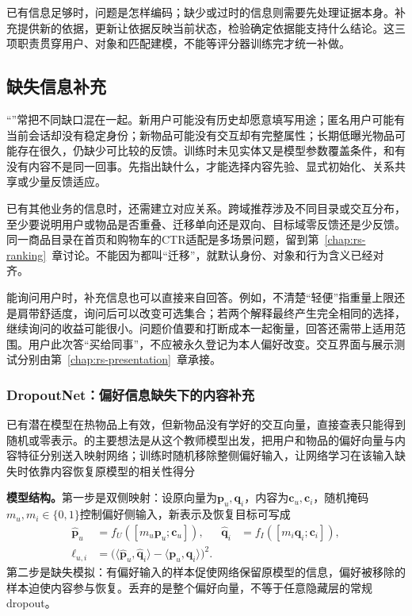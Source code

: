 已有信息足够时，问题是怎样编码；缺少或过时的信息则需要先处理证据本身。补充提供新的依据，更新让依据反映当前状态，检验确定依据能支持什么结论。这三项职责贯穿用户、对象和匹配建模，不能等评分器训练完才统一补做。

\subsection{缺失信息补充}
\label{sec:rs-missing-information}

“”常把不同缺口混在一起。新用户可能没有历史却愿意填写用途；匿名用户可能有当前会话却没有稳定身份；新物品可能没有交互却有完整属性；长期低曝光物品可能存在很久，仍缺少可比较的反馈。训练时未见实体又是模型参数覆盖条件，和有没有内容不是同一回事。先指出缺什么，才能选择内容先验、显式初始化、关系共享或少量反馈适应。

已有其他业务的信息时，还需建立对应关系。跨域推荐涉及不同目录或交互分布，至少要说明用户或物品是否重叠、迁移单向还是双向、目标域零反馈还是少反馈。同一商品目录在首页和购物车的CTR适配是多场景问题，留到第~\ref{chap:rs-ranking}~章讨论。不能因为都叫“迁移”，就默认身份、对象和行为含义已经对齐。

能询问用户时，补充信息也可以直接来自回答。例如，不清楚“轻便”指重量上限还是肩带舒适度，询问后可以改变可选集合；若两个解释最终产生完全相同的选择，继续询问的收益可能很小。问题价值要和打断成本一起衡量，回答还需带上适用范围。用户此次答“买给同事”，不应被永久登记为本人偏好改变。交互界面与展示测试分别由第~\ref{chap:rs-presentation}~章承接。

\subsubsection{DropoutNet：偏好信息缺失下的内容补充}
\label{sec:rs-dropoutnet}

已有潜在模型在热物品上有效，但新物品没有学好的交互向量，直接查表只能得到随机或零表示。的主要想法是从这个教师模型出发，把用户和物品的偏好向量与内容特征分别送入映射网络；训练时随机移除整侧偏好输入，让网络学习在该输入缺失时依靠内容恢复原模型的相关性得分

\textbf{模型结构。}第一步是双侧映射：设原向量为$\bm{p}_u,\bm{q}_i$，内容为$\bm{c}_u,\bm{c}_i$，随机掩码$m_u,m_i\in\{0,1\}$控制偏好侧输入，新表示及恢复目标可写成
\begin{align}
  \widehat{\bm{p}}_u&=f_U([m_u\bm{p}_u;\bm{c}_u]),&
  \widehat{\bm{q}}_i&=f_I([m_i\bm{q}_i;\bm{c}_i]),\\
  \ell_{u,i}&=\bigl(
    \langle\widehat{\bm{p}}_u,\widehat{\bm{q}}_i\rangle
      -\langle\bm{p}_u,\bm{q}_i\rangle\bigr)^2.
  \label{eq:rs-dropoutnet}
\end{align}
第二步是缺失模拟：有偏好输入的样本促使网络保留原模型的信息，偏好被移除的样本迫使内容参与恢复。丢弃的是整个偏好向量，不等于任意隐藏层的常规dropout。

